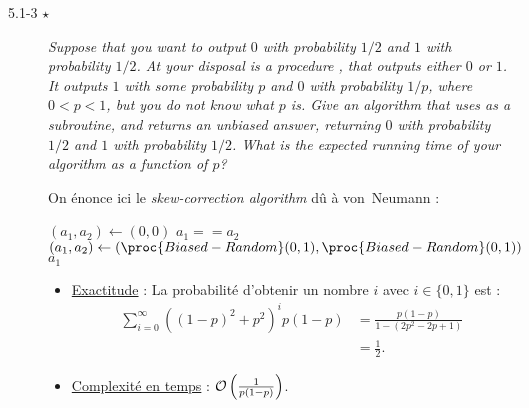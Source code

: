 \begin{description}
\begin{ex}
    \end{ex}
  \item[5.1-3 $\star$] {\itshape Suppose that you want to output $0$ with probability $1/2$ and $1$ with probability $1/2$. At your disposal is a procedure , that outputs either $0$ or $1$. It outputs $1$ with some probability $p$ and $0$ with probability $1/p$, where $0 < p < 1$, but you do not know what $p$ is. Give an algorithm that uses  as a subroutine, and returns an unbiased answer, returning $0$ with probability $1/2$ and $1$ with probability $1/2$. What is the expected running time of your algorithm as a function of $p$?}
    \begin{ex}%
      On \'enonce ici le {\it skew-correction algorithm} dû \`a {\sc von~Neumann} :
      \begin{codebox}
        \li $(a_1, a_2) \gets (0,0)$
        \li \While $a_1 == a_2$ \Do
        \li $(a_1, a_2) \gets (\proc{Biased-Random}(0,1), \proc{Biased-Random}(0,1))$ \End
        \li \Return $a_1$
      \end{codebox}

    \begin{itemize}
      \item \ul{Exactitude} : La probabilit\'e d'obtenir un nombre $i$ avec $i \in \{ 0, 1 \}$ est :
        \begin{align*}
          \sum_{i = 0}^\infty\left( (1-p)^2 + p^2 \right)^i p(1-p) &= \frac{p(1-p)}{1-(2p^2-2p+1)}\\
          &= \frac{1}{2}.
        \end{align*}
      \item \ul{Complexit\'e en temps} : $\mathcal{O}\left(\frac{1}{p(1-p)}\right)$.
    \end{itemize}
    \end{ex}
\end{description}
